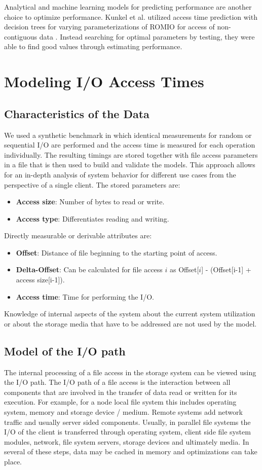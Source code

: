 \documentclass{superfri}
\begin{document}
	Analytical and machine learning models for predicting performance are another choice to optimize performance.
	Kunkel et al. utilized access time prediction with decision trees for varying parameterizations of ROMIO for access of non-contiguous data \cite{UMLTPTPONI15}. 
	Instead searching for optimal parameters by testing, they were able to find good values through estimating performance.
	
	
	\section{Modeling I/O Access Times}
	\label{modeling_access_times}
	\subsection{Characteristics of the Data}
	We used a synthetic benchmark in which identical measurements for random or sequential I/O are performed and the access time is measured for each operation individually.
	The resulting timings are stored together with file access parameters in a file that is then used to build and validate the models.
	This approach allows for an in-depth analysis of system behavior for different use cases from the perspective of a single client.
	The stored parameters are:
	\begin{itemize}
		\item \textbf{Access size}: Number of bytes to read or write.
		\item \textbf{Access type}: Differentiates reading and writing.
	\end{itemize}
	Directly measurable or derivable attributes are:
	\begin{itemize}
		\item \textbf{Offset}: Distance of file beginning to the starting point of access.
		\item \textbf{Delta-Offset}: Can be calculated for file access $i$ as Offset[$i$] - (Offset[i-1] + access size[i-1]).
		\item \textbf{Access time}: Time for performing the I/O.
	\end{itemize}
	Knowledge of internal aspects of the system about the current system utilization or about the storage media that have to be addressed are not used by the model.
	
	\subsection{Model of the I/O path}
	The internal processing of a file access in the storage system can be viewed using the I/O path.	
	The I/O path of a file access is the interaction between all components that are involved in the transfer of data read or written for its execution.
	For example, for a node local file system this includes operating system, memory and storage device / medium. Remote systems add network	traffic and usually server sided components.
	Usually, in parallel file systems the I/O of the client is transferred through operating system, client side file system modules, network, file system servers, storage devices and ultimately media.
	In several of these steps, data may be cached in memory and optimizations can take place.
		
\end{document}

